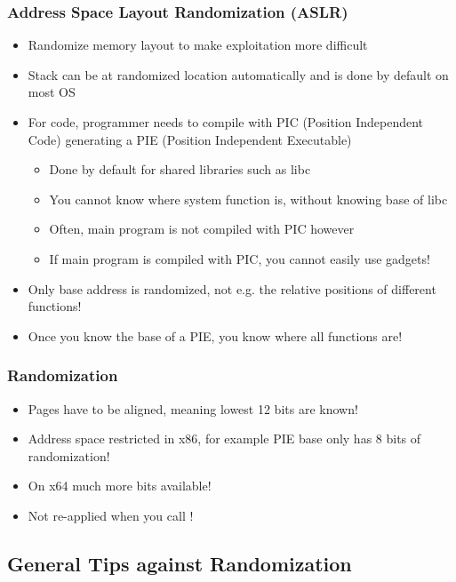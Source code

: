 \documentclass[aspectratio=169]{beamer}
\begin{document}
{\begin{frame}
    \frametitle{Address Space Layout Randomization (ASLR)}
    \begin{itemize}
        \item Randomize memory layout to make exploitation more difficult
        \item Stack can be at randomized location automatically and is done by default on most OS
        \item For code, programmer needs to compile with PIC (Position Independent Code) generating a PIE (Position Independent Executable)
        \begin{itemize}
            \item Done by default for shared libraries such as libc
            \item You cannot know where system function is, without knowing base of libc
            \item Often, main program is not compiled with PIC however
            \item If main program is compiled with PIC, you cannot easily use gadgets!
        \end{itemize}
        \item Only base address is randomized, not e.g. the relative positions of different functions!
        \item Once you know the base of a PIE, you know where all functions are!
    \end{itemize}
\end{frame}

\begin{frame}[fragile]
    \frametitle{Randomization}
    \begin{itemize}
        \item Pages have to be aligned, meaning lowest 12 bits are known!
        \item Address space restricted in x86, for example PIE base only has 8 bits of randomization!
        \item On x64 much more bits available!
        \item Not re-applied when you call !
    \end{itemize}
\end{frame}

\subsection{General Tips against Randomization}

}
\end{document}
